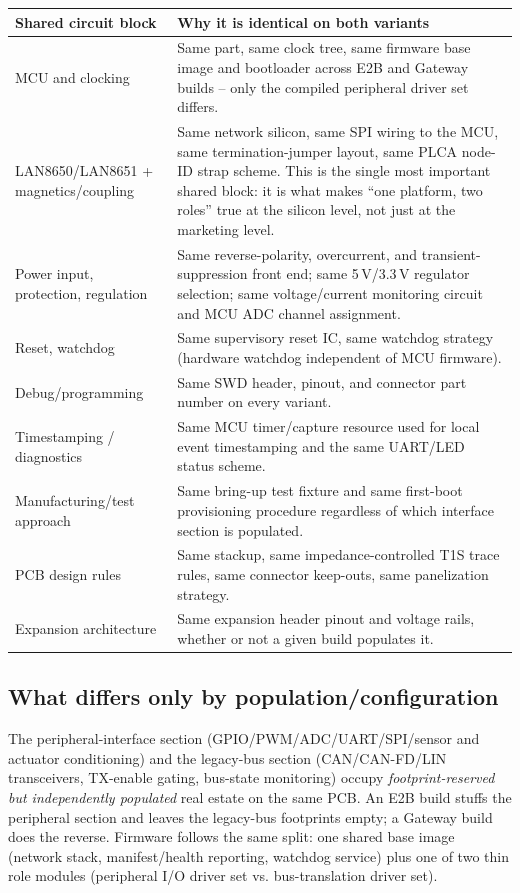 \begin{center}
\small
\begin{tabularx}{\linewidth}{@{}p{3.4cm} X@{}}
\toprule
\textbf{Shared circuit block} & \textbf{Why it is identical on both variants} \\
\midrule
MCU and clocking & Same part, same clock tree, same firmware base image and bootloader across E2B and Gateway builds -- only the compiled peripheral driver set differs. \\
LAN8650/LAN8651 + magnetics/coupling & Same network silicon, same SPI wiring to the MCU, same termination-jumper layout, same PLCA node-ID strap scheme. This is the single most important shared block: it is what makes ``one platform, two roles'' true at the silicon level, not just at the marketing level. \\
Power input, protection, regulation & Same reverse-polarity, overcurrent, and transient-suppression front end; same 5\,V/3.3\,V regulator selection; same voltage/current monitoring circuit and MCU ADC channel assignment. \\
Reset, watchdog & Same supervisory reset IC, same watchdog strategy (hardware watchdog independent of MCU firmware). \\
Debug/programming & Same SWD header, pinout, and connector part number on every variant. \\
Timestamping / diagnostics & Same MCU timer/capture resource used for local event timestamping and the same UART/LED status scheme. \\
Manufacturing/test approach & Same bring-up test fixture and same first-boot provisioning procedure regardless of which interface section is populated. \\
PCB design rules & Same stackup, same impedance-controlled T1S trace rules, same connector keep-outs, same panelization strategy. \\
Expansion architecture & Same expansion header pinout and voltage rails, whether or not a given build populates it. \\
\bottomrule
\end{tabularx}
\end{center}

\subsection{What differs only by population/configuration}

The peripheral-interface section (GPIO/PWM/ADC/UART/SPI/sensor and actuator conditioning) and the legacy-bus section (CAN/CAN-FD/LIN transceivers, TX-enable gating, bus-state monitoring) occupy \emph{footprint-reserved but independently populated} real estate on the same PCB. An E2B build stuffs the peripheral section and leaves the legacy-bus footprints empty; a Gateway build does the reverse. Firmware follows the same split: one shared base image (network stack, manifest/health reporting, watchdog service) plus one of two thin role modules (peripheral I/O driver set vs. bus-translation driver set).


